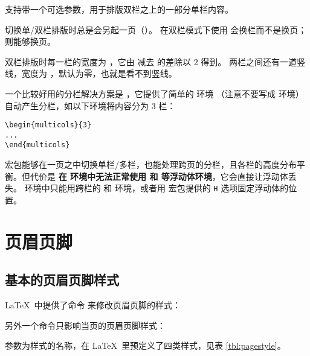  支持带一个可选参数，用于排版双栏之上的一部分单栏内容。

切换单/双栏排版时总是会另起一页（）。
在双栏模式下使用  会换栏而不是换页； 则能够换页。

双栏排版时每一栏的宽度为 ，它由  减去  的差除以 2 得到。
两栏之间还有一道竖线，宽度为 ，默认为零，也就是看不到竖线。

一个比较好用的分栏解决方案是 ，它提供了简单的  环境
（注意不要写成  环境）自动产生分栏，如以下环境将内容分为 3 栏：
\begin{verbatim}
\begin{multicols}{3}
...
\end{multicols}
\end{verbatim}

 宏包能够在一页之中切换单栏/多栏，也能处理跨页的分栏，且各栏的高度分布平衡。但代价是%
\textbf{在  环境中无法正常使用  和  等浮动体环境}，它会直接让浮动体丢失。
 环境中只能用跨栏的  和  环境，或者用  宏包提供的 \texttt{H} 选项固定浮动体的位置。

\section{页眉页脚}\label{sec:pagestyle}

\subsection{基本的页眉页脚样式}\label{subsec:basic-pagesyle}

\LaTeX\ 中提供了命令  来修改页眉页脚的样式：
\begin{command}
\end{command}
另外一个命令只影响当页的页眉页脚样式：
\begin{command}
\end{command}

 参数为样式的名称，在 \LaTeX\ 里预定义了四类样式，见表 \ref{tbl:pagestyle}。

